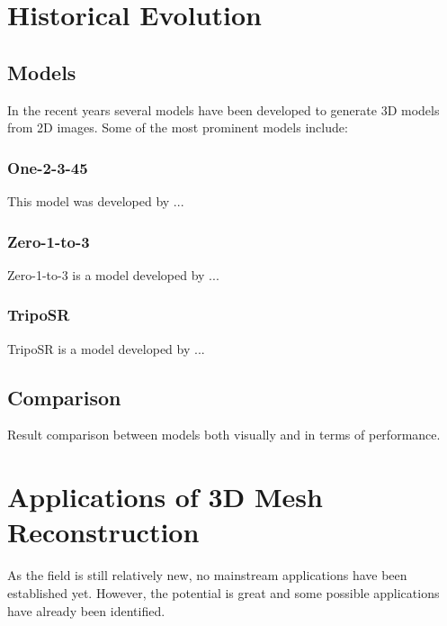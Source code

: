 
\section{Historical Evolution}


\subsection{Models}
In the recent years several models have been developed to generate 3D models from 2D images. Some of the most prominent models include:
\subsubsection{One-2-3-45}
This model was developed by \textcite{liu_one-2-3-45_2023-1}...

\subsubsection{Zero-1-to-3}
Zero-1-to-3 is a model developed by \textcite{liu_zero-1--3_2023}...
\subsubsection{TripoSR}
TripoSR is a model developed by \textcite{tochilkin_triposr_2024}...

\subsection{Comparison}
Result comparison between models both visually and in terms of performance.

\section{Applications of 3D Mesh Reconstruction}
As the field is still relatively new, no mainstream applications have been established yet. However, the potential is great and some possible applications have already been identified.

